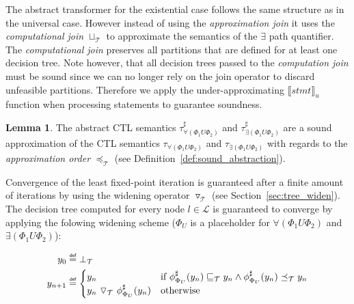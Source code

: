 \documentclass[11pt,a4paper,titlepage]{article}
\theoremstyle{definition}
\newtheorem{lemma}[theorem]{Lemma}
\newcommand\eqdef{\mathrel{\overset{\makebox[0pt]{\mbox{\normalfont\tiny\sffamily def}}}{=}}}
\begin{document}
The abstract transformer for the existential case follows the same structure as in the universal case. 
However instead of using the \textit{approximation join} it uses the \textit{computational join} $\sqcup_\mathcal{T}$ 
to approximate the semantics of the $\exists$ path quantifier. 
The \textit{computational join} preserves all partitions that are defined for at least one decision tree. 
Note however, that all decision trees passed to the \textit{computation join} must be sound since we can no longer 
rely on the join operator to discard unfeasible partitions. Therefore we apply the under-approximating ${\llbracket stmt \rrbracket}_{u}$ 
function when processing statements to guarantee soundness.\\

\begin{lemma}
    The abstract CTL semantics 
    $\tau^{\sharp}_{\forall(\Phi_1 U \Phi_2)}$ and $\tau^{\sharp}_{\exists(\Phi_1 U \Phi_2)}$
    are a sound approximation of the CTL semantics
    $\tau_{\forall(\Phi_1 U \Phi_2)}$ and $\tau_{\exists(\Phi_1 U \Phi_2)}$
    with regards to the \textit{approximation order} $\preceq_\mathcal{T}$ (see Definition~\ref{def:sound_abstraction}).\\
\end{lemma}

Convergence of the least fixed-point iteration is guaranteed after a finite amount of iterations by using the widening operator $\triangledown_\mathcal{T}$ 
(see Section~\ref{sec:tree_widen}). The decision tree computed for every node $l \in \mathcal{L}$ is guaranteed to converge by applying the folowing widening scheme 
($\Phi_U$ is a placeholder for $\forall(\Phi_1 U \Phi_2)$ and $\exists(\Phi_1 U \Phi_2)$):

\begin{align*}
    y_0 &\eqdef \bot_\mathcal{T}\\
    y_{n+1} &\eqdef 
    \begin{cases}
        y_n                   &\text{if} \ \phi^\sharp_{\Phi_{U}}(y_n) \sqsubseteq_\mathcal{T} y_n 
        \land \phi^\sharp_{\Phi_U}(y_n) \preceq_\mathcal{T} y_n  \\
        y_n \ \triangledown_\mathcal{T} \ \phi^\sharp_{\Phi_U}(y_n)     &\text{otherwise}
    \end{cases}
\end{align*}
\end{document}
